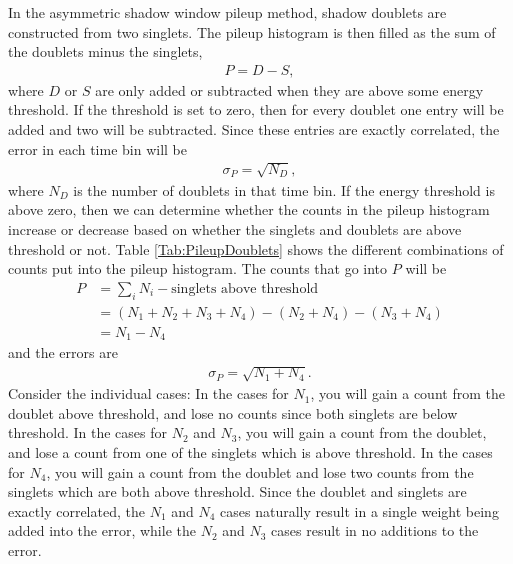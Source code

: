 In the asymmetric shadow window pileup method, shadow doublets are constructed from two singlets. The pileup histogram is then filled as the sum of the doublets minus the singlets,
 	\begin{align}
 		P = D - S,
	\end{align}
where $D$ or $S$ are only added or subtracted when they are above some energy threshold. If the threshold is set to zero, then for every doublet one entry will be added and two will be subtracted. Since these entries are exactly correlated, the error in each time bin will be 
 	\begin{align}
 		\sigma_{P} = \sqrt{N_{D}},
	\end{align}
where $N_{D}$ is the number of doublets in that time bin. If the energy threshold is above zero, then we can determine whether the counts in the pileup histogram increase or decrease based on whether the singlets and doublets are above threshold or not. Table \ref{Tab:PileupDoublets} shows the different combinations of counts put into the pileup histogram. The counts that go into $P$ will be
	\begin{equation}	
	\begin{aligned}
 		P &= \sum_{i}N_{i} - \text{singlets above threshold} \\
 		  &= (N_{1} + N_{2} + N_{3} + N_{4}) - (N_{2} + N_{4}) - (N_{3} + N_{4}) \\
 		  &= N_{1} - N_{4}
	\end{aligned}
	\end{equation}
and the errors are 
 	\begin{align}
 		\sigma_{P} = \sqrt{N_{1} + N_{4}}.
	\end{align}
Consider the individual cases: In the cases for $N_{1}$, you will gain a count from the doublet above threshold, and lose no counts since both singlets are below threshold. In the cases for $N_{2}$ and $N_{3}$, you will gain a count from the doublet, and lose a count from one of the singlets which is above threshold. In the cases for $N_{4}$, you will gain a count from the doublet and lose two counts from the singlets which are both above threshold. Since the doublet and singlets are exactly correlated, the $N_{1}$ and $N_{4}$ cases naturally result in a single weight being added into the error, while the $N_{2}$ and $N_{3}$ cases result in no additions to the error.


